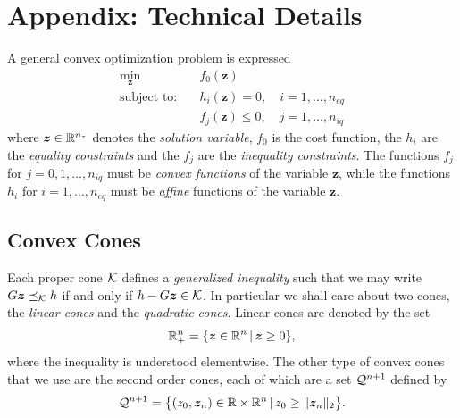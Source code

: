 \documentclass[10pt]{article}
\begin{document}
\clearpage
\section*{Appendix: Technical Details}

A general convex optimization problem is expressed
\begin{subequations}
\begin{align}
\min_{\bm{z}} &\quad f_0(\bm{z}) \\
\text{subject to:} &\quad h_i(\bm{z}) = 0, \quad i=1,\ldots,n_{eq} \\
&\quad f_j(\bm{z}) \leq 0, \quad j = 1,\ldots,n_{iq}
\end{align}
\end{subequations}
where $\bm{z}\in{\mathbb{R}}^{n_z}$ denotes the \textit{solution variable}, $f_0$ is the cost function, the $h_i$ are the \textit{equality constraints} and the $f_j$ are the \textit{inequality constraints}. The functions $f_j$ for $j=0,1,\ldots,n_{iq}$ must be \textit{convex functions} of the variable $\bm{z}$, while the functions $h_i$ for $i=1,\ldots,n_{eq}$ must be \textit{affine} functions of the variable $\bm{z}$.

\subsection*{Convex Cones}

Each proper cone $\mathcal{K}$ defines a \textit{generalized inequality} such that we may write $G \bm{z} \preceq_{\mathcal{K}} h$ if and only if $h - G \bm{z} \in \mathcal{K}$. In particular we shall care about two cones, the \textit{linear cones} and the \textit{quadratic cones}. Linear cones are denoted by the set 
\begin{equation}
{\mathbb{R}}_+^{n} = \{ \bm{z}\in{\mathbb{R}}^n \,|\, \bm{z} \geq 0 \},
\label{eq:lcone_set}
\end{equation}
where the inequality is understood elementwise. The other type of convex cones that we use are the second order cones, each of which are a set $\mathcal{Q}^{n+1}$ defined by
\begin{equation}
\mathcal{Q}^{n+1} = \big\{ (z_0,\bm{z}_n)\in{\mathbb{R}}\times{\mathbb{R}}^n \,|\, z_0 \geq \| \bm{z}_n \|_2 \big\}.
\label{eq:soc_set}
\end{equation}
\end{document}
